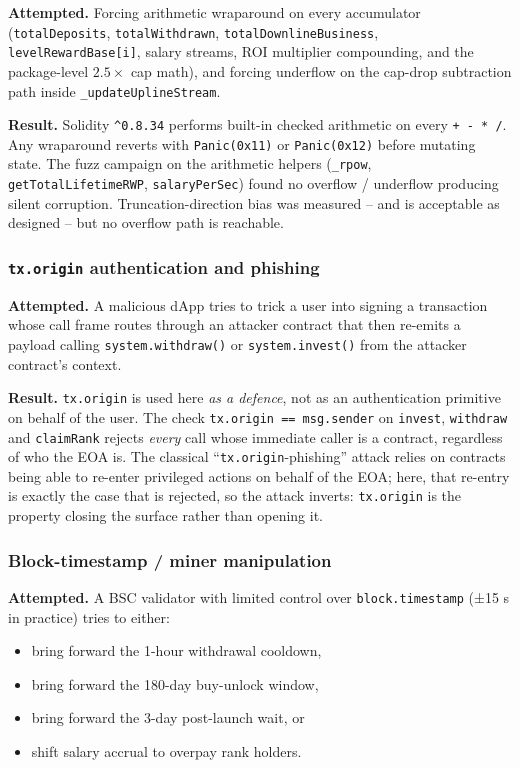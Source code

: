 \documentclass[11pt,a4paper]{article}
\begin{document}
\textbf{Attempted.} Forcing arithmetic wraparound on every accumulator
(\texttt{totalDeposits}, \texttt{totalWithdrawn},
\texttt{totalDownlineBusiness}, \texttt{levelRewardBase[i]}, salary streams,
ROI multiplier compounding, and the package-level $2.5\times$ cap math), and
forcing underflow on the cap-drop subtraction path inside
\texttt{\_updateUplineStream}.

\textbf{Result.} Solidity \texttt{\^{}0.8.34} performs built-in checked
arithmetic on every \texttt{+ - * /}. Any wraparound reverts with
\texttt{Panic(0x11)} or \texttt{Panic(0x12)} before mutating state. The fuzz
campaign on the arithmetic helpers
(\texttt{\_rpow}, \texttt{getTotalLifetimeRWP}, \texttt{salaryPerSec}) found
no overflow / underflow producing silent corruption. Truncation-direction
bias was measured -- and is acceptable as designed -- but no overflow path
is reachable.

\subsubsection*{\texttt{tx.origin} authentication and phishing}

\textbf{Attempted.} A malicious dApp tries to trick a user into signing a
transaction whose call frame routes through an attacker contract that then
re-emits a payload calling \texttt{system.withdraw()} or
\texttt{system.invest()} from the attacker contract's context.

\textbf{Result.} \texttt{tx.origin} is used here \emph{as a defence}, not as
an authentication primitive on behalf of the user. The check
\texttt{tx.origin == msg.sender} on \texttt{invest}, \texttt{withdraw} and
\texttt{claimRank} rejects \emph{every} call whose immediate caller is a
contract, regardless of who the EOA is. The classical
``\texttt{tx.origin}-phishing'' attack relies on contracts being able to
re-enter privileged actions on behalf of the EOA; here, that re-entry is
exactly the case that is rejected, so the attack inverts: \texttt{tx.origin}
is the property closing the surface rather than opening it.

\subsubsection*{Block-timestamp / miner manipulation}

\textbf{Attempted.} A BSC validator with limited control over
\texttt{block.timestamp} (±15 s in practice) tries to either:

\begin{itemize}[leftmargin=*]
    \item bring forward the 1-hour withdrawal cooldown,
    \item bring forward the 180-day buy-unlock window,
    \item bring forward the 3-day post-launch wait, or
    \item shift salary accrual to overpay rank holders.
\end{itemize}
\end{document}
